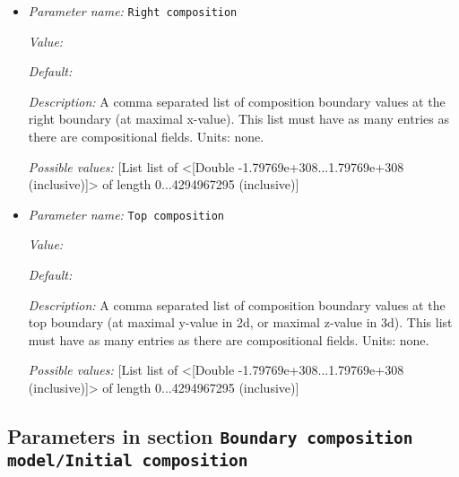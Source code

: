 \begin{itemize}
{\it Description:} A comma separated list of composition boundary values at the left boundary (at minimal x-value). This list must have as many entries as there are compositional fields. Units: none.


{\it Possible values:} [List list of <[Double -1.79769e+308...1.79769e+308 (inclusive)]> of length 0...4294967295 (inclusive)]
\item {\it Parameter name:} {\tt Right composition}


{\it Value:} 


{\it Default:} 


{\it Description:} A comma separated list of composition boundary values at the right boundary (at maximal x-value). This list must have as many entries as there are compositional fields. Units: none.


{\it Possible values:} [List list of <[Double -1.79769e+308...1.79769e+308 (inclusive)]> of length 0...4294967295 (inclusive)]
\item {\it Parameter name:} {\tt Top composition}


{\it Value:} 


{\it Default:} 


{\it Description:} A comma separated list of composition boundary values at the top boundary (at maximal y-value in 2d, or maximal z-value in 3d). This list must have as many entries as there are compositional fields. Units: none.


{\it Possible values:} [List list of <[Double -1.79769e+308...1.79769e+308 (inclusive)]> of length 0...4294967295 (inclusive)]
\end{itemize}

\subsection{Parameters in section \tt Boundary composition model/Initial composition}
\label{parameters:Boundary_20composition_20model/Initial_20composition}

